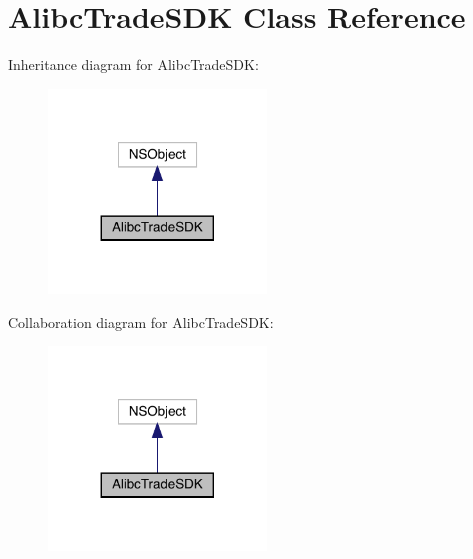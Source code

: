 \hypertarget{interface_alibc_trade_s_d_k}{}\section{Alibc\+Trade\+S\+DK Class Reference}
\label{interface_alibc_trade_s_d_k}


Inheritance diagram for Alibc\+Trade\+S\+DK\+:\nopagebreak
\begin{figure}[H]
\begin{center}
\leavevmode
\includegraphics[width=164pt]{interface_alibc_trade_s_d_k__inherit__graph}
\end{center}
\end{figure}


Collaboration diagram for Alibc\+Trade\+S\+DK\+:\nopagebreak
\begin{figure}[H]
\begin{center}
\leavevmode
\includegraphics[width=164pt]{interface_alibc_trade_s_d_k__coll__graph}
\end{center}
\end{figure}
